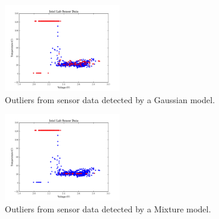 \begin{figure}[h]
\centering
\includegraphics[width=0.45\textwidth]{../graphics/sensors_gm.pdf}
\caption{Outliers from sensor data detected by a Gaussian model.}
\label{fig:sensors_1k_gm}
\end{figure}
\begin{figure}[h]
\centering
\includegraphics[width=0.45\textwidth]{../graphics/sensors_mm.pdf}
\caption{Outliers from sensor data detected by a Mixture model.}
\label{fig:sensors_1k_gm}
\end{figure}
